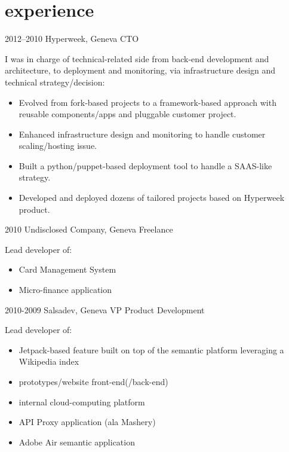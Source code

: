 \documentclass[]{friggeri-cv}
\begin{document}
\section{experience}

\begin{entrylist}
  \entry
    {2012–2010}
    {Hyperweek, Geneva}
    {CTO}
    {I was in charge of technical-related side from back-end development and architecture, to deployment and monitoring, via infrastructure design and technical strategy/decision:
    \begin{itemize}
    \item Evolved from fork-based projects to a framework-based approach with reusable components/apps and pluggable customer project.
    \item Enhanced infrastructure design and monitoring to handle customer scaling/hosting issue.
    \item Built a python/puppet-based deployment tool to handle a SAAS-like strategy.
    \item Developed and deployed dozens of tailored projects based on Hyperweek product.
    \end{itemize}}
  \entry
    {2010}
    {Undisclosed Company, Geneva}
    {Freelance}
    {Lead developer of:
    \begin{itemize}
    \item Card Management System
    \item Micro-finance application
    \end{itemize}}
  \entry
    {2010-2009}
    {Salsadev, Geneva}
    {VP Product Development}
    {Lead developer of:
    \begin{itemize}
    \item Jetpack-based feature built on top of the semantic platform leveraging a Wikipedia index
    \item prototypes/website front-end(/back-end)
    \item internal cloud-computing platform
    \item API Proxy application (ala Mashery)
    \item Adobe Air semantic application
    \end{itemize}}
\end{entrylist}

\clearpage
\end{document}
